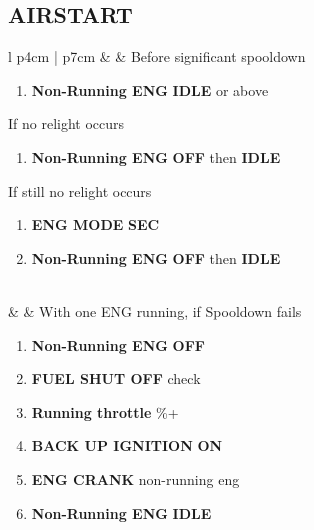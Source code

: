 \documentclass[8pt,usenames,dvipsnames,twoside]{article}
\begin{document}
		\subsection{AIRSTART}
		\begin{center}
			\begin{longtable}{l p{4cm} | p{7cm}}
				\toprule
				\textbullet &  & Before significant spooldown
				\begin{minipage}[t]{\linewidth}
					\vspace{-7pt}
					\begin{enumerate}[label=(\alph*)]
						\item \textbf{Non-Running ENG} \dotfill \textbf{IDLE} or above
					\end{enumerate}
					If no relight occurs
					\begin{enumerate}[label=(\alph*), resume]
						\vspace{-7pt}
						\item \textbf{Non-Running ENG} \dotfill \textbf{OFF} then \textbf{IDLE}
					\end{enumerate}
					\vspace{-7pt}
					If still no relight occurs
					\begin{enumerate}[label=(\alph*), resume]
						\vspace{-7pt}
						\item \textbf{ENG MODE} \dotfill \textbf{SEC}
						\item \textbf{Non-Running ENG} \dotfill \textbf{OFF} then \textbf{IDLE}
					\end{enumerate}
				\end{minipage} \\
				\midrule
				\textbullet &  & 
				With one ENG running, if Spooldown fails
				\begin{minipage}[t]{\linewidth}
					\vspace{-7pt}
					\begin{enumerate}[label=(\alph*)]
						\item \textbf{Non-Running ENG} \dotfill \textbf{OFF}
						\item \textbf{FUEL SHUT OFF} \dotfill check
						\item \textbf{Running throttle} \%+
						\item \textbf{BACK UP IGNITION} \dotfill \textbf{ON}
						\item \textbf{ENG CRANK} \dotfill non-running eng
						\item \textbf{Non-Running ENG} \dotfill \textbf{IDLE}

\end{enumerate}
\end{minipage}
\end{longtable}
\end{center}
\end{document}
